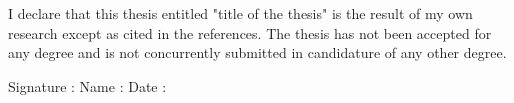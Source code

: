 
\setupindenting[no]
\vfill

I declare that this thesis entitled "title of the thesis" is the result of my
own research except as cited in the references. The thesis has not been
accepted for any degree and is not concurrently submitted in candidature of any
other degree.

\blank[4*line]

    \startmidaligned
    \setupTABLE[c][2][width=1cm,align=middle]
    \bTABLE[frame=off]
        \bTR
            \bTD Signature \eTD
            \bTD : \eTD
            \bTD \periods[25] \eTD
        \eTR
        \bTR
            \bTD Name \eTD
            \bTD : \eTD
            \bTD \periods[25] \eTD
        \eTR
        \bTR
            \bTD Date \eTD
            \bTD : \eTD
            \bTD \periods[25] \eTD
        \eTR
    \eTABLE
    \stopmidaligned

\vfill
\setupindenting[yes]
